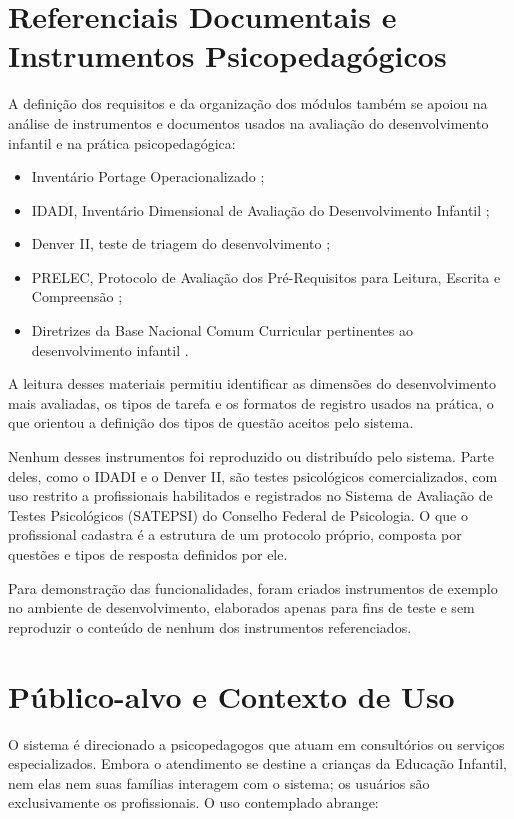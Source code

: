 \section{Referenciais Documentais e Instrumentos Psicopedagógicos}

A definição dos requisitos e da organização dos módulos também se apoiou na análise de instrumentos e documentos usados na avaliação do desenvolvimento infantil e na prática psicopedagógica:

\begin{itemize}
    \item Inventário Portage Operacionalizado \cite{PORTAGE_2018};
    \item IDADI, Inventário Dimensional de Avaliação do Desenvolvimento Infantil \cite{IDADI_2020};
    \item Denver II, teste de triagem do desenvolvimento \cite{DENVER_2018};
    \item PRELEC, Protocolo de Avaliação dos Pré-Requisitos para Leitura, Escrita e Compreensão \cite{PRELEC_2024};
    \item Diretrizes da Base Nacional Comum Curricular pertinentes ao desenvolvimento infantil \cite{bncc2017}.
\end{itemize}

A leitura desses materiais permitiu identificar as dimensões do desenvolvimento mais avaliadas, os tipos de tarefa e os formatos de registro usados na prática, o que orientou a definição dos tipos de questão aceitos pelo sistema.

Nenhum desses instrumentos foi reproduzido ou distribuído pelo sistema. Parte deles, como o IDADI e o Denver II, são testes psicológicos comercializados, com uso restrito a profissionais habilitados e registrados no Sistema de Avaliação de Testes Psicológicos (SATEPSI) do Conselho Federal de Psicologia. O que o profissional cadastra é a estrutura de um protocolo próprio, composta por questões e tipos de resposta definidos por ele. 

Para demonstração das funcionalidades, foram criados instrumentos de exemplo no ambiente de desenvolvimento, elaborados apenas para fins de teste e sem reproduzir o conteúdo de nenhum dos instrumentos referenciados.

\section{Público-alvo e Contexto de Uso}

O sistema é direcionado a psicopedagogos que atuam em consultórios ou serviços especializados. Embora o atendimento se destine a crianças da Educação Infantil, nem elas nem suas famílias interagem com o sistema; os usuários são exclusivamente os profissionais. O uso contemplado abrange:


